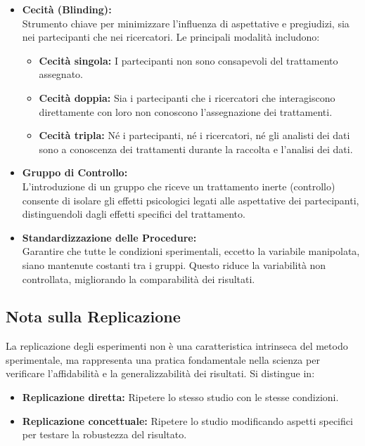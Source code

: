\documentclass[
  letterpaper,
]{krantz}
\providecommand{\tightlist}{%
  \setlength{\itemsep}{0pt}\setlength{\parskip}{0pt}}\usepackage{longtable,booktabs,array}
\begin{document}
\begin{itemize}
\item
  \textbf{Cecità (Blinding):}\\
  Strumento chiave per minimizzare l'influenza di aspettative e
  pregiudizi, sia nei partecipanti che nei ricercatori. Le principali
  modalità includono:

  \begin{itemize}
  \tightlist
  \item
    \textbf{Cecità singola:} I partecipanti non sono consapevoli del
    trattamento assegnato.
  \item
    \textbf{Cecità doppia:} Sia i partecipanti che i ricercatori che
    interagiscono direttamente con loro non conoscono l'assegnazione dei
    trattamenti.
  \item
    \textbf{Cecità tripla:} Né i partecipanti, né i ricercatori, né gli
    analisti dei dati sono a conoscenza dei trattamenti durante la
    raccolta e l'analisi dei dati.
  \end{itemize}
\item
  \textbf{Gruppo di Controllo:}\\
  L'introduzione di un gruppo che riceve un trattamento inerte
  (controllo) consente di isolare gli effetti psicologici legati alle
  aspettative dei partecipanti, distinguendoli dagli effetti specifici
  del trattamento.
\item
  \textbf{Standardizzazione delle Procedure:}\\
  Garantire che tutte le condizioni sperimentali, eccetto la variabile
  manipolata, siano mantenute costanti tra i gruppi. Questo riduce la
  variabilità non controllata, migliorando la comparabilità dei
  risultati.
\end{itemize}

\subsection{Nota sulla Replicazione}\label{nota-sulla-replicazione}

La replicazione degli esperimenti non è una caratteristica intrinseca
del metodo sperimentale, ma rappresenta una pratica fondamentale nella
scienza per verificare l'affidabilità e la generalizzabilità dei
risultati. Si distingue in:

\begin{itemize}
\tightlist
\item
  \textbf{Replicazione diretta:} Ripetere lo stesso studio con le stesse
  condizioni.
\item
  \textbf{Replicazione concettuale:} Ripetere lo studio modificando
  aspetti specifici per testare la robustezza del risultato.
\end{itemize}
\end{document}

